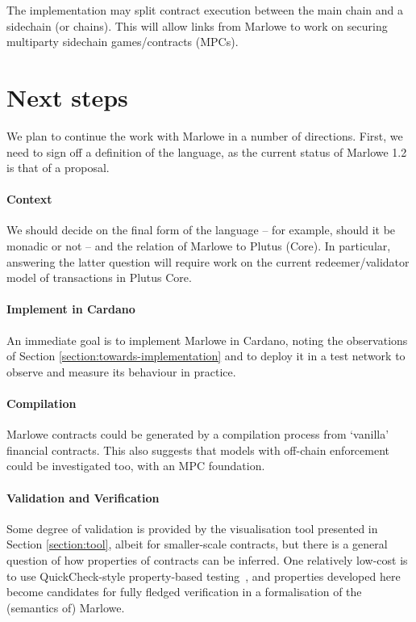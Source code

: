 \documentclass[
      acmsmall
    , screen
    , review=true
  ]{acmart}
\begin{document}
The implementation may split contract execution between the main chain and a sidechain (or chains). This will allow links from Marlowe to work on securing multiparty sidechain games/contracts (MPCs).


\section{Next steps}
\label{section:next-steps}

We plan to continue the work with Marlowe in a number of directions. First, we need to sign off a definition of the language, as the current status of Marlowe 1.2 is that of a proposal.

\paragraph{Context}

We should decide on the final form of the language -- for example, should it be monadic or not -- and the relation of Marlowe to Plutus (Core). In particular, answering the latter question will require work on the current redeemer/validator model of transactions in Plutus Core.

\paragraph{Implement in Cardano}

An immediate goal is to implement Marlowe in Cardano, noting the observations of Section \ref{section:towards-implementation} and to deploy it in a test network to observe and measure its behaviour in practice.

\paragraph{Compilation}

Marlowe contracts could be generated by a compilation process from `vanilla' financial contracts. This also suggests that models with off-chain enforcement could be investigated too, with an MPC foundation.

\paragraph{Validation and Verification}

Some degree of validation is provided by the visualisation tool presented in Section \ref{section:tool}, albeit for smaller-scale contracts, but there is a general question of how properties of contracts can be inferred. One relatively low-cost is to use QuickCheck-style property-based testing~\cite{quickCheck}, and properties developed here become candidates for fully fledged verification in a formalisation of the (semantics of) Marlowe.
\end{document}
